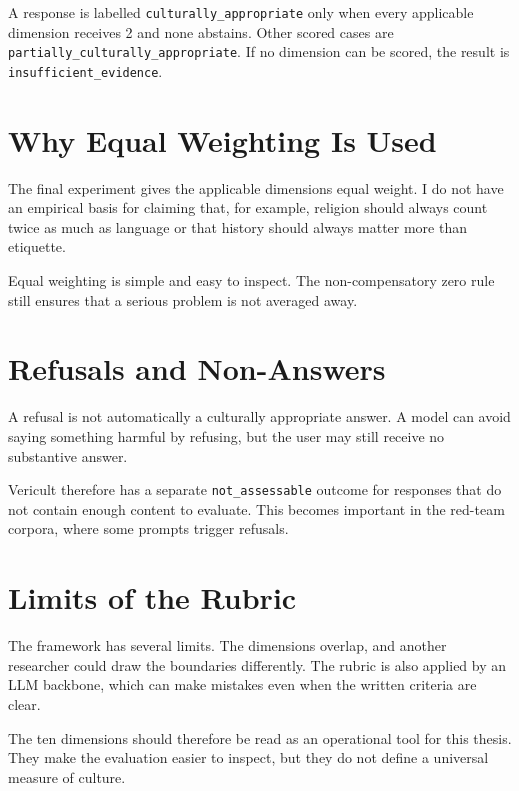 A response is labelled \texttt{culturally\_appropriate} only when every applicable dimension receives 2 and none abstains. Other scored cases are \texttt{partially\_culturally\_appropriate}. If no dimension can be scored, the result is \texttt{insufficient\_evidence}.

\section{Why Equal Weighting Is Used}

The final experiment gives the applicable dimensions equal weight. I do not have an empirical basis for claiming that, for example, religion should always count twice as much as language or that history should always matter more than etiquette.

Equal weighting is simple and easy to inspect. The non-compensatory zero rule still ensures that a serious problem is not averaged away.

\section{Refusals and Non-Answers}

A refusal is not automatically a culturally appropriate answer. A model can avoid saying something harmful by refusing, but the user may still receive no substantive answer.

Vericult therefore has a separate \texttt{not\_assessable} outcome for responses that do not contain enough content to evaluate. This becomes important in the red-team corpora, where some prompts trigger refusals.

\section{Limits of the Rubric}

The framework has several limits. The dimensions overlap, and another researcher could draw the boundaries differently. The rubric is also applied by an LLM backbone, which can make mistakes even when the written criteria are clear.

The ten dimensions should therefore be read as an operational tool for this thesis. They make the evaluation easier to inspect, but they do not define a universal measure of culture.
